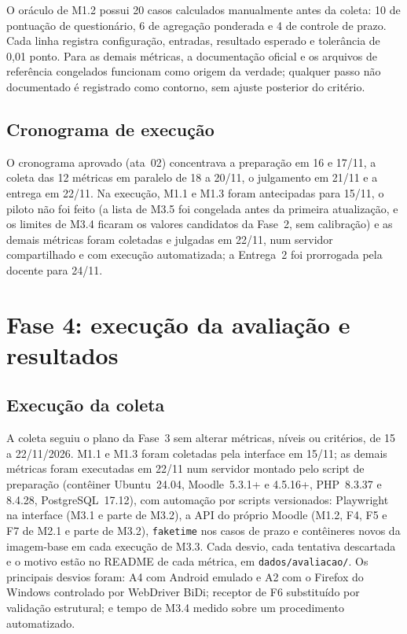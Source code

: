 \documentclass[12pt]{article}
\begin{document}
O oráculo de M1.2 possui 20 casos calculados manualmente antes da coleta: 10 de pontuação de questionário, 6 de agregação ponderada e 4 de controle de prazo. Cada linha registra configuração, entradas, resultado esperado e tolerância de 0,01 ponto. Para as demais métricas, a documentação oficial e os arquivos de referência congelados funcionam como origem da verdade; qualquer passo não documentado é registrado como contorno, sem ajuste posterior do critério.

\subsection{Cronograma de execução}\label{sec:cronograma}

O cronograma aprovado (ata~02) concentrava a preparação em 16 e 17/11, a coleta das 12 métricas em paralelo de 18 a 20/11, o julgamento em 21/11 e a entrega em 22/11. Na execução, M1.1 e M1.3 foram antecipadas para 15/11, o piloto não foi feito (a lista de M3.5 foi congelada antes da primeira atualização, e os limites de M3.4 ficaram os valores candidatos da Fase~2, sem calibração) e as demais métricas foram coletadas e julgadas em 22/11, num servidor compartilhado e com execução automatizada; a Entrega~2 foi prorrogada pela docente para 24/11.

\section{Fase 4: execução da avaliação e resultados}
\label{sec:fase4}

\subsection{Execução da coleta}

A coleta seguiu o plano da Fase~3 sem alterar métricas, níveis ou critérios, de 15 a 22/11/2026. M1.1 e M1.3 foram coletadas pela interface em 15/11; as demais métricas foram executadas em 22/11 num servidor montado pelo script de preparação (contêiner Ubuntu~24.04, Moodle~5.3.1+ e 4.5.16+, PHP~8.3.37 e 8.4.28, PostgreSQL~17.12), com automação por scripts versionados: Playwright na interface (M3.1 e parte de M3.2), a API do próprio Moodle (M1.2, F4, F5 e F7 de M2.1 e parte de M3.2), \texttt{faketime} nos casos de prazo e contêineres novos da imagem-base em cada execução de M3.3. Cada desvio, cada tentativa descartada e o motivo estão no README de cada métrica, em \texttt{dados/avaliacao/}. Os principais desvios foram: A4 com Android emulado e A2 com o Firefox do Windows controlado por WebDriver BiDi; receptor de F6 substituído por validação estrutural; e tempo de M3.4 medido sobre um procedimento automatizado.
\end{document}
